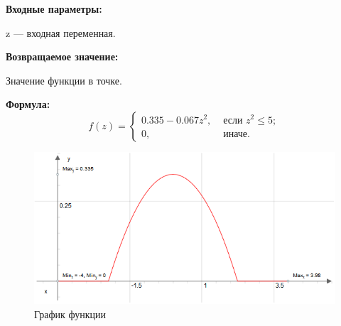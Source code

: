 \textbf{Входные параметры:}
 
z --- входная переменная.

\textbf{Возвращаемое значение:}
 
Значение функции в точке.

\textbf{Формула:}
\begin{equation*}
f\left(z \right)=\left\lbrace \begin{aligned} 0.335-0.067z^2,& \text{ если } z^2\leq 5 ; \\ 0,& \text{ иначе}. \end{aligned}\right.
\end{equation*}

 \begin{figure} [h] 
   \center
   \includegraphics {HML_BellShapedKernelParabola_Graph.png}
   \caption{График функции} 
   \label{img:HML_BellShapedKernelParabola_Graph}  
 \end{figure}
